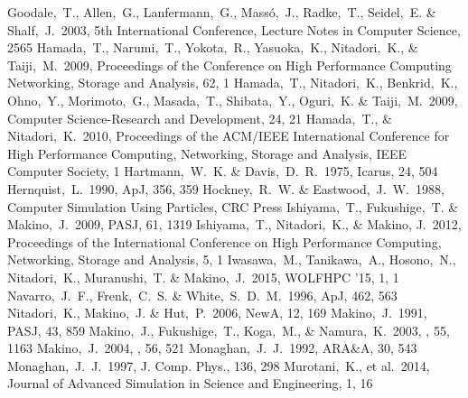 \documentclass[proof]{pasj01}
\newcommand{\icarus}{Icarus}
\begin{document}
\begin{thebibliography}{}
Goodale,~T., Allen,~G., Lanfermann,~G., Mass{\'o},~J., Radke,~T., Seidel,~E. \& Shalf,~J.\ 2003, 5th International Conference, Lecture Notes in Computer Science, 2565
Hamada,~T., Narumi,~T., Yokota,~R., Yasuoka,~K., Nitadori,~K., \& Taiji,~M.\ 2009, Proceedings of the Conference on High Performance Computing Networking, Storage and Analysis, 62, 1  
Hamada,~T., Nitadori,~K., Benkrid,~K., Ohno,~Y., Morimoto,~G., Masada,~T., Shibata,~Y., Oguri,~K. \& Taiji,~M.\ 2009, Computer Science-Research and Development, 24, 21
Hamada,~T., \& Nitadori,~K.\ 2010, Proceedings of the ACM/IEEE International Conference for High Performance Computing, Networking, Storage and Analysis, IEEE Computer Society, 1
{{Hartmann},~W.~K. \& {Davis},~D.~R.}\ 1975, \icarus, 24, 504
{Hernquist},~L.\ 1990, ApJ, 356, 359
Hockney,~R.~W. \& Eastwood,~J.~W.\ 1988, Computer Simulation Using Particles, CRC Press
{Ishiyama},~T., {Fukushige},~T. \& {Makino},~J.\ 2009, PASJ, 61, 1319
Ishiyama,~T., Nitadori,~K., \& Makino, J.\ 2012, Proceedings of the International Conference on High Performance Computing, Networking, Storage and Analysis, 5, 1
Iwasawa,~M., Tanikawa,~A., Hosono,~N., Nitadori,~K., Muranushi,~T. \& Makino,~J.\ 2015, WOLFHPC '15, 1, 1
{{Navarro},~J.~F., {Frenk},~C.~S. \& {White},~S.~D.~M.}\ 1996, ApJ, 462, 563
{Nitadori},~K., {Makino},~J. \& {Hut},~P.\ 2006, NewA, 12, 169
{Makino},~J.\ 1991, PASJ, 43, 859
Makino,~J., Fukushige,~T., Koga,~M., \& Namura,~K.\ 2003, \pasj, 55, 1163
{Makino},~J.\ 2004, \pasj, 56, 521  
{Monaghan},~J.~J.\ 1992, ARA\&A, 30, 543
{Monaghan},~J.~J.\ 1997, J. Comp. Phys., 136, 298
Murotani,~K., et al.\ 2014, Journal of Advanced Simulation in Science and Engineering, 1, 16

\end{thebibliography}
\end{document}
